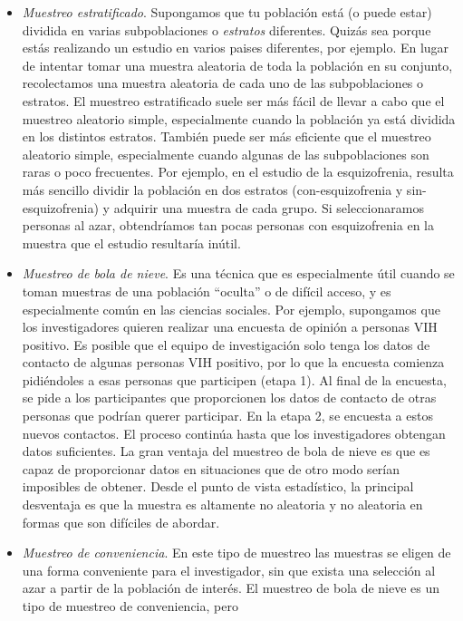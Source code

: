 \documentclass[spanish,]{book}
\begin{document}
\begin{itemize}
\item
  \emph{Muestreo estratificado}. Supongamos que tu población está (o
  puede estar) dividida en varias subpoblaciones o \emph{estratos}
  diferentes. Quizás sea porque estás realizando un estudio en varios
  paises diferentes, por ejemplo. En lugar de intentar tomar una muestra
  aleatoria de toda la población en su conjunto, recolectamos una
  muestra aleatoria de cada uno de las subpoblaciones o estratos. El
  muestreo estratificado suele ser más fácil de llevar a cabo que el
  muestreo aleatorio simple, especialmente cuando la población ya está
  dividida en los distintos estratos. También puede ser más eficiente
  que el muestreo aleatorio simple, especialmente cuando algunas de las
  subpoblaciones son raras o poco frecuentes. Por ejemplo, en el estudio
  de la esquizofrenia, resulta más sencillo dividir la población en dos
  estratos (con-esquizofrenia y sin-esquizofrenia) y adquirir una
  muestra de cada grupo. Si seleccionaramos personas al azar,
  obtendríamos tan pocas personas con esquizofrenia en la muestra que el
  estudio resultaría inútil.
\item
  \emph{Muestreo de bola de nieve}. Es una técnica que es especialmente
  útil cuando se toman muestras de una población ``oculta'' o de difícil
  acceso, y es especialmente común en las ciencias sociales. Por
  ejemplo, supongamos que los investigadores quieren realizar una
  encuesta de opinión a personas VIH positivo. Es posible que el equipo
  de investigación solo tenga los datos de contacto de algunas personas
  VIH positivo, por lo que la encuesta comienza pidiéndoles a esas
  personas que participen (etapa 1). Al final de la encuesta, se pide a
  los participantes que proporcionen los datos de contacto de otras
  personas que podrían querer participar. En la etapa 2, se encuesta a
  estos nuevos contactos. El proceso continúa hasta que los
  investigadores obtengan datos suficientes. La gran ventaja del
  muestreo de bola de nieve es que es capaz de proporcionar datos en
  situaciones que de otro modo serían imposibles de obtener. Desde el
  punto de vista estadístico, la principal desventaja es que la muestra
  es altamente no aleatoria y no aleatoria en formas que son difíciles
  de abordar.
\item
  \emph{Muestreo de conveniencia}. En este tipo de muestreo las muestras
  se eligen de una forma conveniente para el investigador, sin que
  exista una selección al azar a partir de la población de interés. El
  muestreo de bola de nieve es un tipo de muestreo de conveniencia, pero

\end{itemize}
\end{document}
